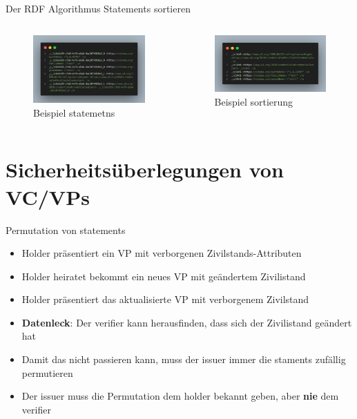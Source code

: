 \documentclass[
	german,%
	authorontitle=true,
	]{bfhbeamer}
\begin{document}
\begin{frame}{Der RDF Algorithmus}
    \centering
    Statements sortieren
    \begin{columns}[onlytextwidth,T]
        \column{70mm}  
        \begin{figure}
            \centering
            \includegraphics[width=70mm]{../img/statements.png}
            \caption{Beispiel statemetns}
        \end{figure}

        \column{70mm}  
        \begin{figure}
            \centering
            \includegraphics[width=70mm]{../img/hashed.png}
            \caption{Beispiel sortierung}
        \end{figure}
    \end{columns}
\end{frame}

\section{Sicherheitsüberlegungen von VC/VPs}

\begin{frame}{Permutation von statements}
    \begin{itemize}
        \item Holder präsentiert ein VP mit verborgenen Zivilstands-Attributen
        \item Holder heiratet bekommt ein neues VP mit geändertem Zivilistand
        \item Holder präsentiert das aktualisierte VP mit verborgenem Zivilstand
        \item \textbf{Datenleck}: Der verifier kann herausfinden, dass sich der Zivilistand geändert hat
        \item Damit das nicht passieren kann, muss der issuer immer die staments zufällig permutieren
        \item Der issuer muss die Permutation dem holder bekannt geben, aber \textbf{nie} dem verifier
    \end{itemize}
\end{frame}
\end{document}
